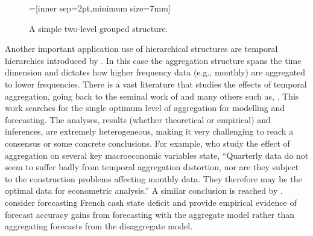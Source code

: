 \documentclass[graybox]{svmult}
\begin{document}
\begin{figure}[!hbt]
\center
{}=[inner sep=2pt,minimum size=7mm]
  \caption{A simple two-level grouped structure.}
  \label{fig:simple grouped tree}
\end{figure}

Another important application use of hierarchical structures are temporal hierarchies introduced by \cite{AthEtAl2017}. In this case the aggregation structure spans the time dimension and dictates how higher frequency data (e.g., monthly) are aggregated to lower frequencies. There is a vast literature that studies the effects of temporal aggregation, going back to the seminal work of \cite{ZelMon1971, AmeWu1972, Tia1972, Bre1973} and many others such as, \cite{Hot1993, HotCar1993, Mar1999, SilEtAl2008}. This work searches for the single optimum level of aggregation for modelling and forecasting. The analyses, results (whether theoretical or empirical) and inferences, are extremely heterogeneous, making it very challenging to reach a consensus or some concrete conclusions. For example, \cite{RosSea1995} who study the effect of aggregation on several key macroeconomic variables state, ``Quarterly data do not seem to suffer badly from temporal aggregation distortion, nor are they subject to the construction problems affecting monthly data. They therefore may be the optimal data for econometric analysis.'' A similar conclusion is reached by \cite{NijPal1990}. \cite{SilEtAl2008} consider forecasting French cash state deficit and provide empirical evidence of forecast accuracy gains from forecasting with the aggregate model rather than aggregating forecasts from the disaggregate model.
\end{document}
